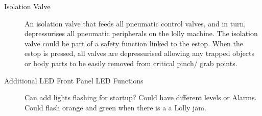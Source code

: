 \begin{description}
    \item[Isolation Valve] An isolation valve that feeds all pneumatic control valves, and in turn, depressurises all pneumatic peripherals on the lolly machine. The isolation valve could be part of a safety function linked to the \acrshort{estop}. When the \acrshort{estop} is pressed, all valves are depressurised allowing any trapped objects or body parts to be easily removed from critical pinch/ grab points.

    \item[Additional LED Front Panel LED Functions] Can add lights flashing for startup? Could have different levels or Alarms. Could flash orange and green when there is a a Lolly jam. 
\end{description}



